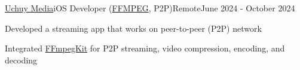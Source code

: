\begin{resume_employer}{\href{https://uchuymedia.uz}{Uchuy Media}}{iOS Developer (\href{https://github.com/arthenica/ffmpeg-kit}{FFMPEG}, P2P)}{Remote}{June 2024 - October 2024}
    \item Developed a streaming app that works on peer-to-peer (P2P) network
    \item Integrated \href{https://github.com/arthenica/ffmpeg-kit}{FFmpegKit} for P2P streaming, video compression, encoding, and decoding
 \end{resume_employer}

